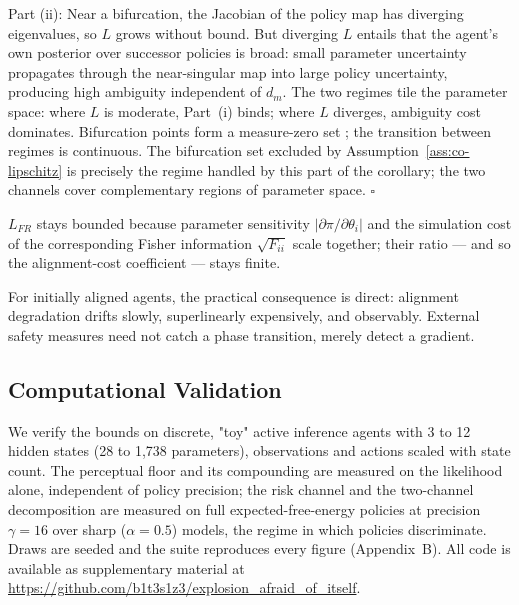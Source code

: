 \documentclass[runningheads]{llncs}
\begin{document}
Part (ii): Near a bifurcation, the Jacobian of the policy map has diverging eigenvalues, so $L$ grows without bound. But diverging $L$ entails that the agent's own posterior over successor policies is broad: small parameter uncertainty propagates through the near-singular map into large policy uncertainty, producing high ambiguity independent of $d_m$. The two regimes tile the parameter space: where $L$ is moderate, Part~(i) binds; where $L$ diverges, ambiguity cost dominates. Bifurcation points form a measure-zero set \cite{petersen2016}; the transition between regimes is continuous. The bifurcation set excluded by Assumption~\ref{ass:co-lipschitz} is precisely the regime handled by this part of the corollary; the two channels cover complementary regions of parameter space. $\square$

\begin{remark}
$L_{FR}$ stays bounded because parameter sensitivity $|\partial\pi/\partial\theta_i|$ and the simulation cost of the corresponding Fisher information $\sqrt{F_{ii}}$ scale together; their ratio --- and so the alignment-cost coefficient --- stays finite.
\end{remark}

For initially aligned agents, the practical consequence is direct: alignment degradation drifts slowly, superlinearly expensively, and observably. External safety measures need not catch a phase transition, merely detect a gradient.

\subsection{Computational Validation}\label{sec:validation}

We verify the bounds on discrete, "toy" active inference agents with 3 to 12 hidden
states (28 to 1{,}738 parameters), observations and actions scaled with state
count. The perceptual floor and its compounding are measured on the likelihood
alone, independent of policy precision; the risk channel and the two-channel
decomposition are measured on full expected-free-energy policies at precision
$\gamma = 16$ over sharp ($\alpha = 0.5$) models, the regime in which policies
discriminate. Draws are seeded and the suite reproduces every figure
(Appendix~B). All code is available as supplementary material at \url{https://github.com/b1t3s1z3/explosion_afraid_of_itself}.
\end{document}
